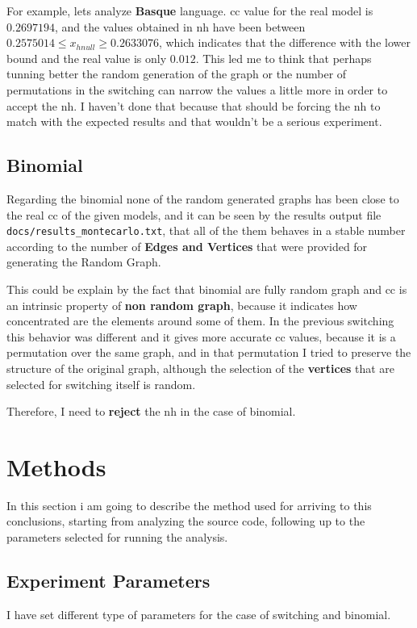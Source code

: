 \documentclass[12pt, a4paper]{article}
\begin{document}
For example, lets analyze \textbf{Basque} language. \acrshort{cc} value for the real model is $0.2697194$, and the values obtained
in \acrshort{nh} have been between  $0.2575014 \leq x_{hnull} \geq 0.2633076$, which indicates that the difference with the lower bound and the real
value is only $0.012$. This led me to think that perhaps tunning better the random generation of the graph or the number of permutations in the \acrshort{switching}
can narrow the values a little more in order to accept the \acrshort{nh}. I haven't done that because that should be forcing the \acrshort{nh} to match with the expected
results and that wouldn't be a serious experiment.

\subsection{Binomial}
Regarding the \acrshort{binomial} none of the random generated graphs has been close to the real \acrshort{cc} of the given models,
and it can be seen by the results output file \texttt{docs/results_montecarlo.txt}, that all of the them behaves in a stable number according to the 
number of \textbf{Edges and Vertices} that were provided for generating the Random Graph.

This could be explain by the fact that \acrshort{binomial} are fully random graph and \acrshort{cc} is an intrinsic property of \textbf{non random graph}, because it indicates how concentrated 
are the elements around some of them. In the previous \acrshort{switching} this behavior was different and it gives more accurate \acrshort{cc} values, because it is a permutation
over the same graph, and in that permutation I tried to preserve the structure of the original graph, although the selection of the \textbf{vertices} that are selected for switching itself is random.

Therefore, I need to \textbf{reject} the \acrshort{nh} in the case of \acrshort{binomial}.

\section{Methods}
In this section i am going to describe the method used for arriving to this conclusions, starting from analyzing the source code, following up to the parameters selected
for running the analysis.


\subsection{Experiment Parameters}
I have set different type of parameters for the case of \acrshort{switching} and \acrshort{binomial}.
\end{document}
